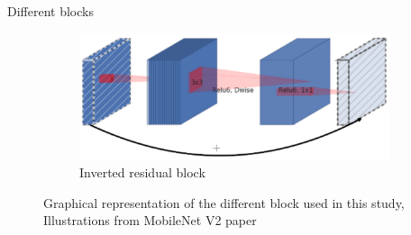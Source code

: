\documentclass{beamer}
\begin{document}
\begin{frame}{Different blocks}
\begin{figure}
\begin{center}
    \begin{subfigure}[t]{.5\linewidth}
      \centering
      \includegraphics[width=.99\linewidth]{figures/mobilenetv2_inverted_residual_botleneck.png}
      \caption{Inverted residual block \cite{sandler2018mobilenetv2}}
      \label{fig:invertedbottleneckblock}
    \end{subfigure}
    \caption{Graphical representation of the different block used in this study, Illustrations from MobileNet V2 paper \cite{sandler2018mobilenetv2}}
  \end{center}
\end{figure}
\end{frame}{}
\end{document}

